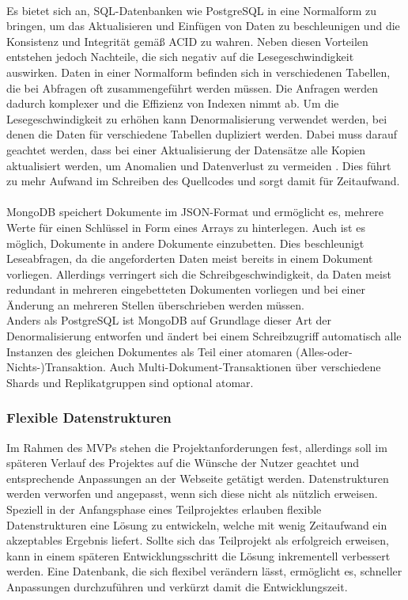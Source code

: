 \paragraph{}
Es bietet sich an, SQL-Datenbanken wie PostgreSQL in eine Normalform zu bringen, um das Aktualisieren und Einfügen von Daten zu beschleunigen und die Konsistenz und Integrität gemäß ACID zu wahren.
Neben diesen Vorteilen entstehen jedoch Nachteile, die sich negativ auf die Lesegeschwindigkeit auswirken.
Daten in einer Normalform befinden sich in verschiedenen Tabellen, die bei Abfragen oft zusammengeführt werden müssen.
Die Anfragen werden dadurch komplexer und die Effizienz von Indexen nimmt ab.
Um die Lesegeschwindigkeit zu erhöhen kann Denormalisierung verwendet werden, bei denen die Daten für verschiedene Tabellen dupliziert werden.
Dabei muss darauf geachtet werden, dass bei einer Aktualisierung der Datensätze alle Kopien aktualisiert werden, um Anomalien und Datenverlust zu vermeiden \cite{db:denormalization}.
Dies führt zu mehr Aufwand im Schreiben des Quellcodes und sorgt damit für Zeitaufwand.


\paragraph{}
MongoDB speichert Dokumente im JSON-Format und ermöglicht es, mehrere Werte für einen Schlüssel in Form eines Arrays zu hinterlegen.
Auch ist es möglich, Dokumente in andere Dokumente einzubetten. \cite{db:mongoEmbeddedDocuments}
Dies beschleunigt Leseabfragen, da die angeforderten Daten meist bereits in einem Dokument vorliegen.
Allerdings verringert sich die Schreibgeschwindigkeit, da Daten meist redundant in mehreren eingebetteten Dokumenten vorliegen und bei einer Änderung an mehreren Stellen überschrieben werden müssen.\\
Anders als PostgreSQL ist MongoDB auf Grundlage dieser Art der Denormalisierung entworfen und ändert bei einem Schreibzugriff automatisch alle Instanzen des gleichen Dokumentes als Teil einer atomaren (Alles-oder-Nichts-)Transaktion.
Auch Multi-Dokument-Transaktionen über verschiedene Shards und Replikatgruppen sind optional atomar. \cite{db:mongoAcidCompliance}

\subsubsection{Flexible Datenstrukturen}
Im Rahmen des MVPs stehen die Projektanforderungen fest, allerdings soll im späteren Verlauf des Projektes auf die Wünsche der Nutzer geachtet und entsprechende Anpassungen an der Webseite getätigt werden.
Datenstrukturen werden verworfen und angepasst, wenn sich diese nicht als nützlich erweisen.
Speziell in der Anfangsphase eines Teilprojektes erlauben flexible Datenstrukturen eine Lösung zu entwickeln, welche mit wenig Zeitaufwand ein akzeptables Ergebnis liefert.
Sollte sich das Teilprojekt als erfolgreich erweisen, kann in einem späteren Entwicklungsschritt die Lösung inkrementell verbessert werden.
Eine Datenbank, die sich flexibel verändern lässt, ermöglicht es, schneller Anpassungen durchzuführen und verkürzt damit die Entwicklungszeit.

